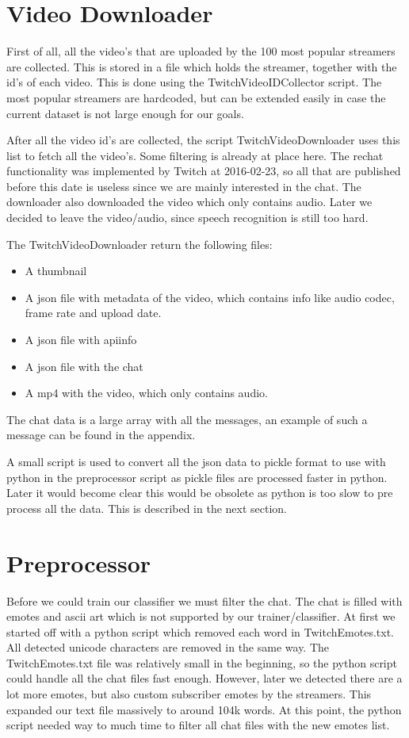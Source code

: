 \documentclass[final]{report}
\begin{document}
\section{Video Downloader}
First of all, all the video's that are uploaded by the 100 most popular streamers are collected. This is stored in a file which holds the streamer, together with the id's of each video.
This is done using the TwitchVideoIDCollector script. The most popular streamers are hardcoded, but can be extended easily in case the current dataset is not large enough for our goals.

After all the video id's are collected, the script TwitchVideoDownloader uses this list to fetch all the video's.
Some filtering is already at place here. The rechat functionality was implemented by Twitch at 2016-02-23, so all that are published before this date is useless since we are mainly interested in the chat.
The downloader also downloaded the video which only contains audio. Later we decided to leave the video/audio, since speech recognition is still too hard.

The TwitchVideoDownloader return the following files:
\begin{itemize}
\item A thumbnail
\item A json file with metadata of the video, which contains info like audio codec, frame rate and upload date.
\item A json file with apiinfo
\item A json file with the chat
\item A mp4 with the video, which only contains audio.
\end{itemize}

The chat data is a large array with all the messages, an example of such a message can be found in the appendix.

A small script is used to convert all the json data to pickle format to use with python in the preprocessor script as pickle files are processed faster in python. Later it would become clear this would be obsolete as python is too slow to pre process all the data. This is described in the next section.

\section{Preprocessor}
Before we could train our classifier we must filter the chat.
The chat is filled with emotes and ascii art which is not supported by our trainer/classifier.
At first we started off with a python script which removed each word in TwitchEmotes.txt.
All detected unicode characters are removed in the same way.
The TwitchEmotes.txt file was relatively small in the beginning, so the python script could handle all the chat files fast enough.
However, later we detected there are a lot more emotes, but also custom subscriber emotes by the streamers.
This expanded our text file massively to around 104k words. 
At this point, the python script needed way to much time to filter all chat files with the new emotes list.
\end{document}
